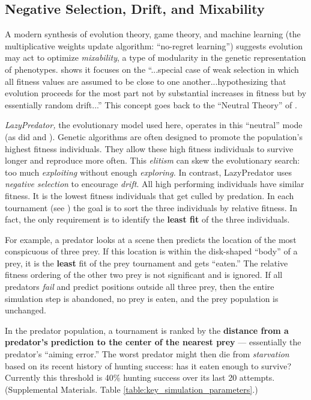 \documentclass[letterpaper]{article}
\newcommand{\jargon}[1]{\textit{#1}}
\newcommand{\lazypredator}[0]{LazyPredator}
\begin{document}
\subsection{Negative Selection, Drift, and Mixability}

A modern synthesis \citep{livnat_sex_2016} of evolution theory, game theory, and machine learning (the multiplicative weights update algorithm: “no-regret learning”) suggests evolution may act to optimize \jargon{mixability}, a type of modularity in the genetic representation of phenotypes. \citet{chastain_multiplicative_2013} shows it focuses on the “...special case of weak selection in which all fitness values are assumed to be close to one another...hypothesizing that evolution proceeds for the most part not by substantial increases in fitness but by essentially random drift...” This concept goes back to the “Neutral Theory” of \citet{kimura_evolutionary_1968}.
\par
\jargon{\lazypredator{},} the evolutionary model used here, operates in this “neutral” mode (as did \citet{reynolds_iec_2011} and \citet{harrington_coevolution_2014}). Genetic algorithms are often designed to promote the population's highest fitness individuals. They allow these high fitness individuals to survive longer and reproduce more often. This \jargon{elitism} can skew the evolutionary search: too much \jargon{exploiting} without enough \jargon{exploring.}  In contrast, \lazypredator{} uses \textit{negative selection} to encourage \jargon{drift}. All high performing individuals have similar fitness. It is the lowest fitness individuals that get culled by predation. In each tournament (see ) the goal is to sort the three individuals by relative fitness. In fact, the only requirement is to identify the \textbf{least fit} of the three individuals.
\par 
For example, a predator looks at a scene then predicts the location of the most conspicuous of three prey. If this location is within the disk-shaped “body” of a prey, it is the \textbf{least} fit of the prey tournament and gets “eaten.” The relative fitness ordering of the other two prey is not significant and is ignored. If all predators \jargon{fail} and predict positions outside all three prey, then the entire simulation step is abandoned, no prey is eaten, and the prey population is unchanged.
\par
In the predator population, a tournament is ranked by the \textbf{distance from a predator's prediction to the center of the nearest prey} — essentially the predator's “aiming error.” The worst predator might then die from \jargon{starvation} based on its recent history of hunting success: has it eaten enough to survive? Currently this threshold is 40\% hunting success over its last 20 attempts. (Supplemental Materials. Table \ref{table:key_simulation_parameters}.)
\end{document}
